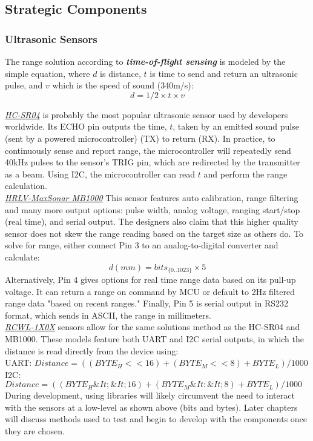 
\subsection{Strategic Components}

\subsubsection{Ultrasonic Sensors} \label{sssec:tof}
\noindent The range solution according to \textbf{\textit{time-of-flight sensing}} is modeled by the simple equation, where $d$ is distance, $t$ is time to send and return an ultrasonic pulse, and $v$ which is the speed of sound (340m/s):
$$d = 1/2 \times t \times v$$

\noindent \underline{\textit{HC-SR04}} is probably the most popular ultrasonic sensor used by developers worldwide. Its ECHO pin outputs the time, $t$, taken by an emitted sound pulse (sent by a powered microcontroller) (TX) to return (RX). In practice, to continuously sense and report range, the microcontroller will repeatedly send 40kHz pulses to the sensor's TRIG pin, which are redirected by the transmitter as a beam. Using I2C, the microcontroller can read $t$ and perform the range calculation.\\

\noindent \underline{\textit{HRLV-MaxSonar MB1000}} This sensor features auto calibration, range filtering and many more output options: pulse width, analog voltage, ranging start/stop (real time), and serial output. The designers also claim that this higher quality sensor does not skew the range reading based on the target size as others do. To solve for range, either connect Pin 3 to an analog-to-digital converter and calculate:
$$d (mm) = bits_{\{0..1023\}} \times 5$$
Alternatively, Pin 4 gives options for real time range data based on its pull-up voltage. It can return a range on command by MCU or default to 2Hz filtered range data "based on recent ranges." Finally, Pin 5 is serial output in RS232 format, which sends in ASCII, the range in millimeters.\\

\noindent \underline{\textit{RCWL-1X0X}} sensors allow for the same solutions method as the HC-SR04 and MB1000. These models feature both UART and I2C serial outputs, in which the distance is read directly from the device using:\\
UART: $Distance = ((BYTE_H << 16) + (BYTE_M << 8) + BYTE_L) /1000$\\
I2C: $Distance = ((BYTE_H\&It; \&It; 16) + (BYTE_M\&It: \&It; 8)+BYTE_L) /1000$\\
\noindent During development, using libraries will likely circumvent the need to interact with the sensors at a low-level as shown above (bits and bytes). Later chapters will discuss methods used to test and begin to develop with the components once they are chosen.\\

